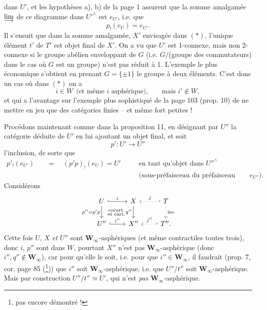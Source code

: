 \documentclass[11pt]{article}
\newcommand{\printedpage}[1]{\marginpar{\footnotesize p.~#1}}
\newcommand{\msp}[1]{\marginpar{\footnotesize [#1]}}
\newcommand{\Winf}{\mathbf{W}_{\infty}}
\begin{document}
\printedpage{5}

dans $U'$, et les hypothèses a), b) de la page 1 assurent que la somme amalgamée $\varinjlim$ de ce diagramme dans $U'^{\wedge}$ est $e_{U'}$, i.e. que
\[ p_!(e_U) = e_{U'}. \]
Il s'ensuit que dans la somme amalgamée, $X'$ envisagée dans $(*)$, l'unique élément $t'$ de $T'$ est objet final de $X'$. On a vu que $U'$ est 1-connexe, mais non 2-connexe si le groupe abélien enveloppant de $G$ (i.e. $G/$(groupe des commutateurs) dans le cas où $G$ est un groupe) n'est pas réduit à 1. L'exemple le plus économique s'obtient en prenant $G = \{\pm 1\}$ le groupe à deux éléments. C'est donc un cas où dans $(*)$ on a
\[ i \in W \ \ \text{(et même $i$ asphérique),} \qquad \text{mais } i' \notin W, \]
et qui a l'avantage sur l'exemple plus sophistiqué de la page 103 (prop. 10) de ne mettre en jeu que des catégories finies -- et même fort petites !

Procédons maintenant comme dans la proposition 11, en désignant par $U''$ la catégorie déduite de $U'$ en lui ajoutant un objet
\msp{page 7}
final, et soit
\[ p' : U' \longrightarrow U'' \]
l'inclusion, de sorte que
\[
\begin{aligned}
p'_!(e_{U'}) \quad &= \quad (p'p)_!(e_U) = U' \quad && \text{en tant qu'objet dans } U''^{\wedge}\\
& && \text{(sous-préfaisceau du préfaisceau final } e_{U''}\text{).}
\end{aligned}
\]
Considérons
\[
\begin{tikzcd}
U \arrow[r, hook, "i"] \arrow[d, "{p''=p'p}"'] \arrow[dr, phantom, "\begin{smallmatrix}\text{cocart.}\\ \text{et cart.}\end{smallmatrix}"] & X \arrow[d, "q''"'] & T \arrow[l, hook', dotted, "j"'] \arrow[d, dotted, "\text{iso}"] \\
U'' \arrow[r, hook, "i''"] & X'' & T''. \arrow[l, hook', dotted, "j''"']
\end{tikzcd}
\]
Cette fois $U$, $X$ \textit{et} $U''$ sont $\Winf$-asphériques (et même contractiles toutes trois), donc $i$, $p''$ sont dans $W$, pourtant $X''$ n'est pas $\Winf$-asphérique (donc $i'', q'' \notin \Winf$), car pour qu'elle le soit, i.e. pour que $i'' \in \Winf$, il faudrait (prop. 7, cor. page 85 (\footnote[4]{pas encore démontré !})) que $i''$ soit $\Winf$-asphérique, i.e. que $U''/t''$ soit $\Winf$-asphérique. Mais par construction $U''/t'' \simeq U'$, qui n'est \textit{pas} $\Winf$-asphérique.
\end{document}
